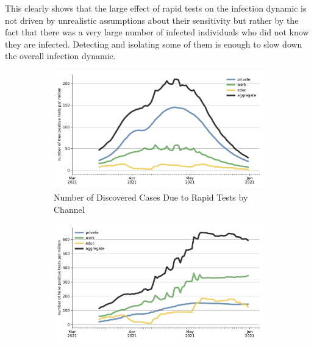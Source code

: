 This clearly shows that the large effect of rapid tests on the infection dynamic
is not driven by unrealistic assumptions about their sensitivity but rather by the
fact that there was a very large number of infected individuals who did not know they
are infected. Detecting and isolating some of them is enough to slow down the
overall infection dynamic.

\begin{figure}   %
    \centering
    \begin{subfigure}[b]{0.425\textwidth}
        \centering
        \includegraphics[width=\textwidth]{figures/results/figures/rapid_test_statistics/number_true_positive}
        \caption{Number of Discovered Cases Due to Rapid Tests by Channel}
        \label{fig:rapid_tests_number_true_positive}
    \end{subfigure}
    \hfill
    \begin{subfigure}[b]{0.425\textwidth}
        \centering
        \includegraphics[width=\textwidth]{figures/results/figures/rapid_test_statistics/number_false_positive}

\end{subfigure}
\end{figure}
